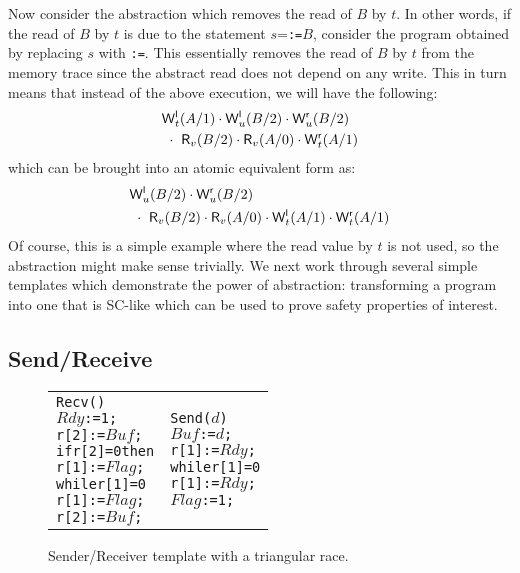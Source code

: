 \documentclass[preprint,9pt]{sigplanconf}
\begin{document}
Now consider the abstraction which removes the read of $B$ by $t$.
In other words, if the read of $B$ by $t$ is due to the statement $s$={\tt {}:=$B$}, consider the program obtained by replacing $s$ with {\tt {}:=\alihavocval}.
This essentially removes the read of $B$ by $t$ from the memory trace since the abstract read does not depend on any write.
This in turn means that instead of the above execution, we will have the following:
\begin{eqnarray*}
&\mathsf{W}^{\mathsf{l}}_{t}(A/1) \cdot \mathsf{W}^{\mathsf{l}}_{u}(B/2) \cdot \mathsf{W}^{\mathsf{r}}_{u}(B/2)\\
&\ \cdot\ \mathsf{R}_{v}(B/2) \cdot \mathsf{R}_{v}(A/0) \cdot \mathsf{W}^{\mathsf{r}}_{t}(A/1)
\end{eqnarray*}
which can be brought into an atomic equivalent form as:
\begin{eqnarray*}
&\mathsf{W}^{\mathsf{l}}_{u}(B/2) \cdot \mathsf{W}^{\mathsf{r}}_{u}(B/2)\\
&\ \cdot\ \mathsf{R}_{v}(B/2) \cdot \mathsf{R}_{v}(A/0) \cdot \mathsf{W}^{\mathsf{l}}_{t}(A/1) \cdot \mathsf{W}^{\mathsf{r}}_{t}(A/1)
\end{eqnarray*}
Of course, this is a simple example where the read value by $t$ is not used, so the abstraction might make sense trivially. 
We next work through several simple templates which demonstrate the power of abstraction: transforming a program into one that is SC-like which can be used to prove safety properties of interest.
 
\subsection{Send/Receive}
\label{subsec:send-receive}

\begin{figure}[h]
\begin{tabular}{p{}p{}}
\begin{alltt}Recv()
 \(Rdy\):=1;
 r[2]:=\(Buf\);
 if r[2]=0 then
   r[1]:=\(Flag\);
   while r[1]=0 
     r[1]:=\(Flag\);
   r[2]:=\(Buf\);\end{alltt}
&
\begin{alltt}Send(\(d\))
 \(Buf\):=\(d\);
 r[1]:=\(Rdy\);
 while r[1]=0 
   r[1]:=\(Rdy\);
 \(Flag\):=1;\end{alltt}
\end{tabular}
\caption{Sender/Receiver template with a triangular race.}
\label{fig:send-receive}
\end{figure}
\end{document}
